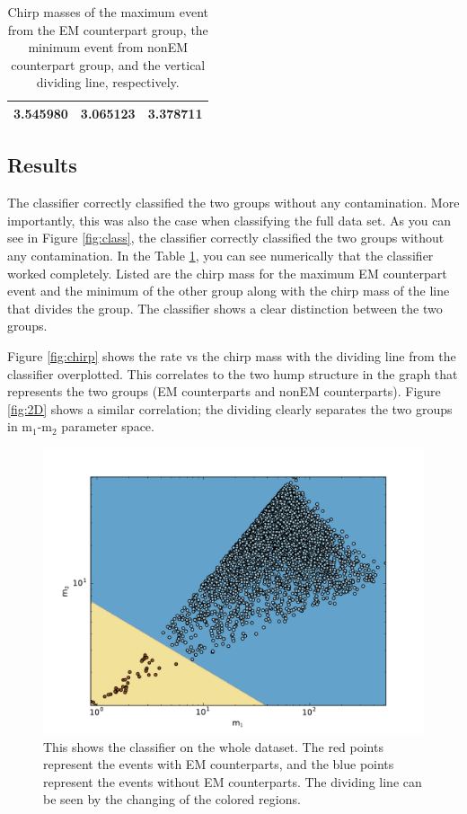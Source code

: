\begin{table}[ht]
\caption{Chirp masses of the maximum event from the EM counterpart group, the minimum event from nonEM counterpart group, and the vertical dividing line, respectively.}
\centering
\begin{tabular}{c c c}
\hline\hline
3.545980 & 3.065123 & 3.378711\\
\hline\hline
\end{tabular}
\label{tab:mass}
\end{table}

\subsection{Results}
The classifier correctly classified the two groups without any contamination. More importantly, this was also the case when classifying the full data set. As you can see in Figure \ref{fig:class}, the classifier correctly classified the two groups without any contamination. In the Table \ref{tab:mass}, you can see numerically that the classifier worked completely. Listed are the chirp mass for the maximum EM counterpart event and the minimum of the other group along with the chirp mass of the line that divides the group. The classifier shows a clear distinction between the two groups.



Figure \ref{fig:chirp} shows the rate vs the chirp mass with the dividing line from the classifier overplotted. This correlates to the two hump structure in the graph that represents the two groups (EM counterparts and nonEM counterparts). Figure \ref{fig:2D} shows a similar correlation; the dividing clearly separates the two groups in  m$_{1}$-m$_{2}$ parameter space.

\begin{figure}[ht]
  \includegraphics[width=\columnwidth]{img/classifier-2D.pdf}
  \caption{This shows the classifier on the whole dataset. The red points represent the events with EM counterparts, and the blue points represent the events without EM counterparts. The dividing line can be seen by the changing of the colored regions.}
  \label{fig:2dclass}
\end{figure}

